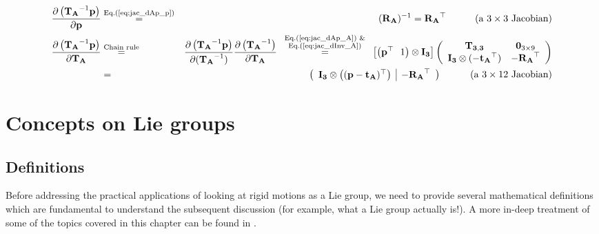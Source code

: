 \documentclass[a4paper,11pt]{report}
\begin{document}
\begin{eqnarray}
\label{eq:jac_dp_min_p}
\frac{\partial \left( \mathbf{T_A} ^{-1} \mathbf{p} \right) }{\partial \mathbf{p} }
&\overset{\text{Eq.(\ref{eq:jac_dAp_p})}}{=}&
(\mathbf{R_A})^{-1}
=\mathbf{R_A}^\top
\quad \quad \quad
\text{(a $3 \times 3$ Jacobian)}
\\
\frac{\partial \left( \mathbf{T_A} ^{-1} \mathbf{p} \right) }{\partial \mathbf{T_A} }
& \overset{\text{Chain rule}}{=}&
\frac{\partial \left( \mathbf{T_A} ^{-1} \mathbf{p} \right) }{\partial (\mathbf{T_A}^{-1}) }
\frac{\partial \left( \mathbf{T_A} ^{-1} \right) }{\partial \mathbf{T_A} }
\overset{ \scriptsize{ \begin{array}{c} \text{Eq.(\ref{eq:jac_dAp_A}) \&} \\  \text{Eq.(\ref{eq:jac_dInv_A})} \end{array} } }
{=}
\left[
\left( \mathbf{p}^\top ~~ 1 \right) \otimes \mathbf{I_3}
\right]
\left(
\begin{array}{cc}
 \mathbf{T_{3,3}} & \mathbf{0}_{3 \times 9} \\
 \mathbf{I_3} \otimes (-\mathbf{t_A}^\top) & - \mathbf{R_A}^\top
\end{array}
\right)
\\
&=&
\label{eq:jac_dp_min_A}
\left(
\begin{array}{c|c}
 \mathbf{I_3} \otimes \left( (\mathbf{p}-\mathbf{t_A})^\top \right)
 &
 -\mathbf{R_A}^\top
\end{array}
\right)
\quad \quad \quad
\text{(a $3 \times 12$ Jacobian)}
\end{eqnarray}




\chapter{Concepts on Lie groups}
\label{chap:lie_intro}

\section{Definitions}
\label{sect:lie_defs}

Before addressing the practical applications of looking at rigid motions
as a Lie group,
we need to provide several mathematical definitions which are fundamental
to understand the subsequent discussion
(for example, what a Lie group actually is!).
A more in-deep treatment of some of the topics covered in this chapter
can be found in \cite{gallier2001geometric,varadarajan1974lie}.
\end{document}
